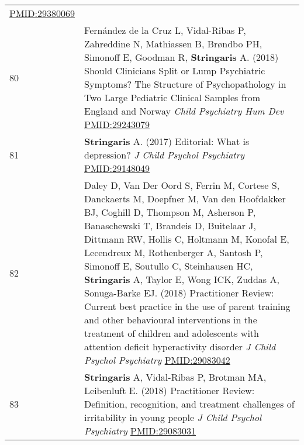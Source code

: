 \documentclass[
]{article}
\begin{document}
\begin{longtable}[]{@{}ll@{}}
\begin{minipage}[t]{0.94\columnwidth}
\url{PMID:29380069}\strut
\end{minipage}\tabularnewline
\begin{minipage}[t]{0.01\columnwidth}\raggedright
80\strut
\end{minipage} & \begin{minipage}[t]{0.94\columnwidth}\raggedright
Fernández de la Cruz L, Vidal-Ribas P, Zahreddine N, Mathiassen B,
Brøndbo PH, Simonoff E, Goodman R, \textbf{Stringaris} A. (2018) Should
Clinicians Split or Lump Psychiatric Symptoms? The Structure of
Psychopathology in Two Large Pediatric Clinical Samples from England and
Norway \emph{Child Psychiatry Hum Dev} \url{PMID:29243079}\strut
\end{minipage}\tabularnewline
\begin{minipage}[t]{0.01\columnwidth}\raggedright
81\strut
\end{minipage} & \begin{minipage}[t]{0.94\columnwidth}\raggedright
\textbf{Stringaris} A. (2017) Editorial: What is depression? \emph{J
Child Psychol Psychiatry} \url{PMID:29148049}\strut
\end{minipage}\tabularnewline
\begin{minipage}[t]{0.01\columnwidth}\raggedright
82\strut
\end{minipage} & \begin{minipage}[t]{0.94\columnwidth}\raggedright
Daley D, Van Der Oord S, Ferrin M, Cortese S, Danckaerts M, Doepfner M,
Van den Hoofdakker BJ, Coghill D, Thompson M, Asherson P, Banaschewski
T, Brandeis D, Buitelaar J, Dittmann RW, Hollis C, Holtmann M, Konofal
E, Lecendreux M, Rothenberger A, Santosh P, Simonoff E, Soutullo C,
Steinhausen HC, \textbf{Stringaris} A, Taylor E, Wong ICK, Zuddas A,
Sonuga-Barke EJ. (2018) Practitioner Review: Current best practice in
the use of parent training and other behavioural interventions in the
treatment of children and adolescents with attention deficit
hyperactivity disorder \emph{J Child Psychol Psychiatry}
\url{PMID:29083042}\strut
\end{minipage}\tabularnewline
\begin{minipage}[t]{0.01\columnwidth}\raggedright
83\strut
\end{minipage} & \begin{minipage}[t]{0.94\columnwidth}\raggedright
\textbf{Stringaris} A, Vidal-Ribas P, Brotman MA, Leibenluft E. (2018)
Practitioner Review: Definition, recognition, and treatment challenges
of irritability in young people \emph{J Child Psychol Psychiatry}
\url{PMID:29083031}\strut

\end{minipage}
\end{longtable}
\end{document}
